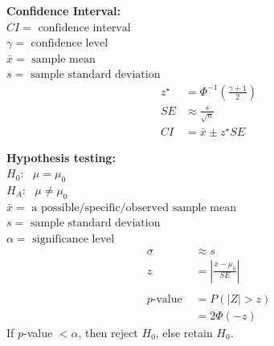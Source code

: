 \documentclass[12pt,letterpaper,addpoints]{exam}
\begin{document}
\begin{multicols}{2}
{\bf Confidence Interval:}\\
$CI = \text{ confidence interval}$\\
$\gamma = \text{ confidence level}$\\
$\bar{x} = \text{ sample mean}$ \\
$s = \text{ sample standard deviation}$ 
\begin{align*}
z^{\star} &= \Phi^{-1}\left(\frac{\gamma+1}{2} \right) \\
SE &\approx \frac{s}{\sqrt{n}}\\
CI &= \bar{x} \pm z^{\star} SE
\end{align*}

{\bf Hypothesis testing:}\\
$H_0:~~~\mu = \mu_0$\\
$H_A:~~~\mu \ne \mu_0$\\
$\bar{x} = \text{ a possible/specific/observed sample mean}$\\
$s = \text{ sample standard deviation}$\\
$\alpha = \text{ significance level} $
\begin{align*}
\sigma &\approx s\\
z &= \left| \frac{\bar{x}-\mu_0}{SE} \right|\\\\
p\text{-value } &= P\left(\lvert Z \rvert > z  \right)\\
&= 2 \Phi\left( -z \right)
\end{align*}
If $p$-value $< \alpha$, then reject $H_0$, else retain $H_0$.

\end{multicols}
\end{document}
